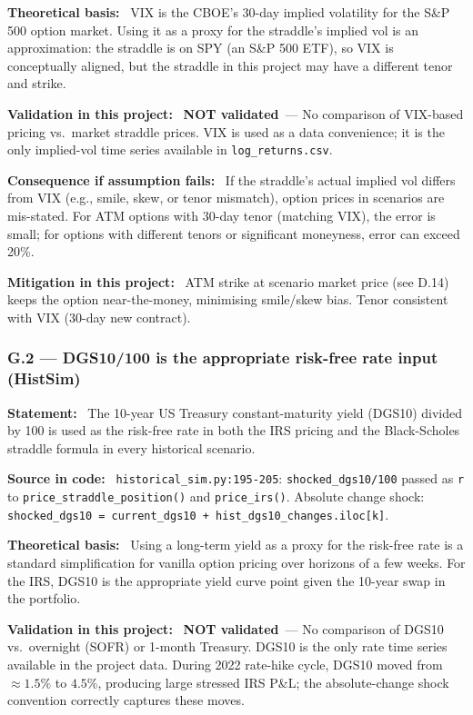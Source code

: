 \documentclass[11pt,a4paper]{article}
\newcommand{\asmfield}[1]{\medskip\noindent\textbf{#1:}\ }
\newcommand{\code}[1]{\texttt{#1}}
\newcommand{\notvalidated}{\textbf{NOT validated}}
\begin{document}
\asmfield{Theoretical basis}
VIX is the CBOE's 30-day implied volatility for the S\&P 500 option market.
Using it as a proxy for the straddle's implied vol is an approximation:
the straddle is on SPY (an S\&P 500 ETF), so VIX is conceptually aligned,
but the straddle in this project may have a different tenor and strike.

\asmfield{Validation in this project}
\notvalidated\ --- No comparison of VIX-based pricing vs.\ market straddle
prices. VIX is used as a data convenience; it is the only implied-vol time
series available in \code{log\_returns.csv}.

\asmfield{Consequence if assumption fails}
If the straddle's actual implied vol differs from VIX (e.g., smile, skew,
or tenor mismatch), option prices in scenarios are mis-stated. For ATM
options with 30-day tenor (matching VIX), the error is small; for options
with different tenors or significant moneyness, error can exceed 20\%.

\asmfield{Mitigation in this project}
ATM strike at scenario market price (see D.14) keeps the option near-the-money,
minimising smile/skew bias. Tenor consistent with VIX (30-day new contract).

\subsubsection{G.2 --- DGS10/100 is the appropriate risk-free rate input (HistSim)}\label{asm:G2}

\asmfield{Statement}
The 10-year US Treasury constant-maturity yield (DGS10) divided by 100
is used as the risk-free rate in both the IRS pricing and the
Black-Scholes straddle formula in every historical scenario.

\asmfield{Source in code}
\code{historical\_sim.py:195-205}: \lstinline|shocked_dgs10/100| passed
as \code{r} to \code{price\_straddle\_position()} and \code{price\_irs()}.
Absolute change shock: \lstinline|shocked_dgs10 = current_dgs10 + hist_dgs10_changes.iloc[k]|.

\asmfield{Theoretical basis}
Using a long-term yield as a proxy for the risk-free rate is a standard
simplification for vanilla option pricing over horizons of a few weeks.
For the IRS, DGS10 is the appropriate yield curve point given the
10-year swap in the portfolio.

\asmfield{Validation in this project}
\notvalidated\ --- No comparison of DGS10 vs.\ overnight (SOFR) or 1-month
Treasury. DGS10 is the only rate time series available in the project data.
During 2022 rate-hike cycle, DGS10 moved from $\approx 1.5\%$ to $4.5\%$,
producing large stressed IRS P\&L; the absolute-change shock convention
correctly captures these moves.
\end{document}
